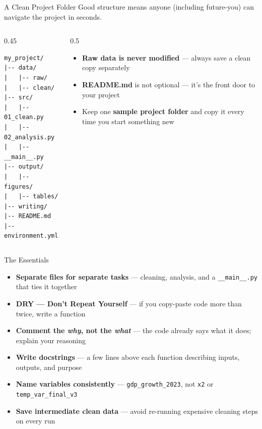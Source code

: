 \documentclass[13pt, aspectratio=169]{beamer}
\begin{document}
\begin{frame}[fragile]{A Clean Project Folder}
    Good structure means anyone (including future-you) can navigate the project in seconds.

    \vspace{0.5em}
    \begin{columns}
        \begin{column}{0.45\textwidth}
\begin{lstlisting}
my_project/
|-- data/
|   |-- raw/
|   |-- clean/
|-- src/
|   |-- 01_clean.py
|   |-- 02_analysis.py
|   |-- __main__.py
|-- output/
|   |-- figures/
|   |-- tables/
|-- writing/
|-- README.md
|-- environment.yml
\end{lstlisting}
        \end{column}
        \begin{column}{0.5\textwidth}
            \begin{itemize}
                \item \textbf{Raw data is never modified} — always save a clean copy separately
                \item \textbf{README.md} is not optional — it's the front door to your project
                \item Keep one \textbf{sample project folder} and copy it every time you start something new
            \end{itemize}
        \end{column}
    \end{columns}
\end{frame}

\begin{frame}{The Essentials}
    \begin{itemize}
        \item \textbf{Separate files for separate tasks} — cleaning, analysis, and a \texttt{\_\_main\_\_.py} that ties it together
        \item \textbf{DRY — Don't Repeat Yourself} — if you copy-paste code more than twice, write a function
        \item \textbf{Comment the \textit{why}, not the \textit{what}} — the code already says what it does; explain your reasoning
        \item \textbf{Write docstrings} — a few lines above each function describing inputs, outputs, and purpose
        \item \textbf{Name variables consistently} — \texttt{gdp\_growth\_2023}, not \texttt{x2} or \texttt{temp\_var\_final\_v3}
        \item \textbf{Save intermediate clean data} — avoid re-running expensive cleaning steps on every run
    \end{itemize}
\end{frame}
\end{document}
